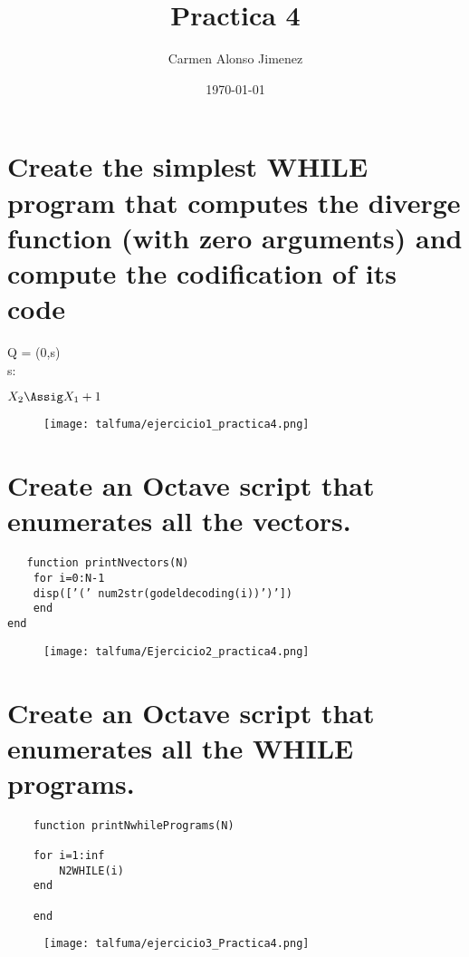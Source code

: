 \documentclass[11pt]{article}
\title{\textbf{Practica 4}}
\author{Carmen Alonso Jimenez}
\date{\today}
\begin{document}
\maketitle
\thispagestyle{plain}
\setlength{\parskip}{6pt}

\section{Create the simplest WHILE program that computes the diverge function (with
zero arguments) and compute the codification of its code}
	Q = (0,s)
   \\ s:
	
\begin{whilecode}[H]

$X_2 \Assig X_1 + 1$\;
\end{whilecode}
\begin{figure}[htp]
\centering
\texttt{[image: talfuma/ejercicio1\_practica4.png]}
\caption{}
\label{}
\end{figure}
\section{Create an Octave script that enumerates all the vectors.}
\begin{verbatim}
   function printNvectors(N)
	for i=0:N-1
	disp([’(’ num2str(godeldecoding(i))’)’])
	end
end
    \end{verbatim}
    
\begin{figure}[htp]
\centering
\texttt{[image: talfuma/Ejercicio2\_practica4.png]}
\caption{}
\label{}
\end{figure}
\section{Create an Octave script that enumerates all the WHILE programs.}
 \begin{verbatim}
    function printNwhilePrograms(N)

    for i=1:inf
        N2WHILE(i)
    end
    
    end
    \end{verbatim}
    
 \begin{figure}[htp]
\centering
\texttt{[image: talfuma/ejercicio3\_Practica4.png]}
\caption{}
\label{}
\end{figure}   
\end{document}
